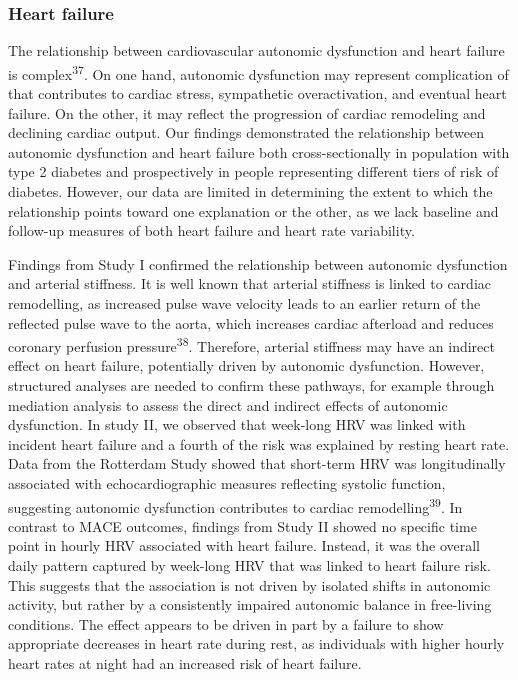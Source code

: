 \documentclass[
  a4paper,
  headsepline=true,
  open=any]{scrbook}
\begin{document}
\hypertarget{heart-failure-1}{%
\subsubsection{Heart failure}\label{heart-failure-1}}

The relationship between cardiovascular autonomic dysfunction and heart
failure is complex\textsuperscript{37}. On one hand, autonomic
dysfunction may represent complication of that contributes to cardiac
stress, sympathetic overactivation, and eventual heart failure. On the
other, it may reflect the progression of cardiac remodeling and
declining cardiac output. Our findings demonstrated the relationship
between autonomic dysfunction and heart failure both cross-sectionally
in population with type 2 diabetes and prospectively in people
representing different tiers of risk of diabetes. However, our data are
limited in determining the extent to which the relationship points
toward one explanation or the other, as we lack baseline and follow-up
measures of both heart failure and heart rate variability.

Findings from Study I confirmed the relationship between autonomic
dysfunction and arterial stiffness. It is well known that arterial
stiffness is linked to cardiac remodelling, as increased pulse wave
velocity leads to an earlier return of the reflected pulse wave to the
aorta, which increases cardiac afterload and reduces coronary perfusion
pressure\textsuperscript{38}. Therefore, arterial stiffness may have an
indirect effect on heart failure, potentially driven by autonomic
dysfunction. However, structured analyses are needed to confirm these
pathways, for example through mediation analysis to assess the direct
and indirect effects of autonomic dysfunction. In study II, we observed
that week-long HRV was linked with incident heart failure and a fourth
of the risk was explained by resting heart rate. Data from the Rotterdam
Study showed that short-term HRV was longitudinally associated with
echocardiographic measures reflecting systolic function, suggesting
autonomic dysfunction contributes to cardiac
remodelling\textsuperscript{39}. In contrast to MACE outcomes, findings
from Study II showed no specific time point in hourly HRV associated
with heart failure. Instead, it was the overall daily pattern captured
by week-long HRV that was linked to heart failure risk. This suggests
that the association is not driven by isolated shifts in autonomic
activity, but rather by a consistently impaired autonomic balance in
free-living conditions. The effect appears to be driven in part by a
failure to show appropriate decreases in heart rate during rest, as
individuals with higher hourly heart rates at night had an increased
risk of heart failure.
\end{document}
